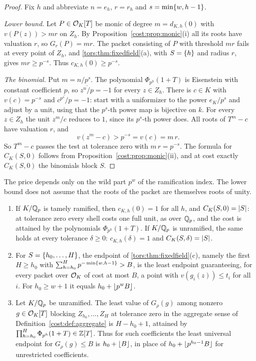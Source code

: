 \begin{proof}
Fix $h$ and abbreviate $n=e_h$, $r=r_h$ and $s=\min\{w,h-1\}$.

\emph{Lower bound.} Let $P\in\mathcal{O}_K[T]$ be monic of degree $m=d_{K,h}(0)$ with
$v(P(z))>mr$ on $Z_h$. By Proposition~\ref{cost:prop:monic}(i) all its roots have
valuation $r$, so $G_r(P)=mr$. The packet consisting of $P$ with threshold $mr$ fails at
every point of $Z_h$, and \cref{tors:thm:fixedfield}\textup{(a)}, with $S=\{h\}$ and
radius $r$, gives $mr\ge p^{-s}$. Thus $c_{K,h}(0)\ge p^{-s}$.

\emph{The binomial.} Put $m=n/p^s$. The polynomial $\Phi_{p^h}(1+T)$ is Eisenstein with
constant coefficient $p$, so $\overline{z^n/p}=-1$ for every $z\in Z_h$. There is $c\in K$
with $v(c)=p^{-s}$ and $\overline{c^{p^s}/p}=-1$: start with a uniformizer to the power
$e_K/p^s$ and adjust by a unit, using that the $p^s$-th power map is bijective on $k$. For
every $z\in Z_h$ the unit $z^m/c$ reduces to $1$, since its $p^s$-th power does. All roots
of $T^m-c$ have valuation $r$, and
\[
 v(z^m-c)>p^{-s}=v(c)=m\,r.
\]
So $T^m-c$ passes the test at tolerance zero with $m\,r=p^{-s}$. The formula for
$C_K(S,0)$ follows from Proposition~\ref{cost:prop:monic}(ii), and at cost exactly
$C_K(S,0)$ the binomials block $S$.
\end{proof}

The price depends only on the wild part $p^w$ of the ramification index. The lower bound
does not assume that the roots of the packet are themselves roots of unity.

\begin{corollary}\label{cost:cor:fieldendpoint}
\leavevmode
\begin{enumerate}[label=\textup{(\roman*)}]
\item If $K/\mathbb{Q}_p$ is tamely ramified, then $c_{K,h}(0)=1$ for all $h$, and
$C_K(S,0)=\lvert S\rvert$: at tolerance zero every shell costs one full unit, as over $\mathbb{Q}_p$, and
the cost is attained by the polynomials $\Phi_{p^h}(1+T)$. If $K/\mathbb{Q}_p$ is unramified, the
same holds at every tolerance $\delta\ge0$: $c_{K,h}(\delta)=1$ and
$C_K(S,\delta)=\lvert S\rvert$.
\item For $S=\{h_0,\ldots,H\}$, the endpoint of
\cref{tors:thm:fixedfield}\textup{(c)}, namely the first $H\ge h_0$ with
$\sum_{h=h_0}^Hp^{-\min\{w,h-1\}}>B$, is the least endpoint
guaranteeing, for every packet over $\mathcal{O}_K$ of cost at most $B$, a point with
$v(g_i(z))\le t_i$ for all $i$. For $h_0\ge w+1$ it equals $h_0+\lfloor p^wB\rfloor$.
\item Let $K/\mathbb{Q}_p$ be unramified. The least value of $G_\rho(g)$ among nonzero
$g\in\mathcal{O}_K[T]$ blocking $Z_{h_0},\ldots,Z_H$ at tolerance zero in the aggregate sense of
Definition~\ref{cost:def:aggregate} is $H-h_0+1$, attained by
$\prod_{h=h_0}^H\Phi_{p^h}(1+T)\in\mathbb{Z}[T]$. Thus for such coefficients the least universal
endpoint for $G_\rho(g)\le B$ is $h_0+\lfloor B\rfloor$, in place of $h_0+\lfloor p^{h_0-1}B\rfloor$ for
unrestricted coefficients.
\end{enumerate}
\end{corollary}

